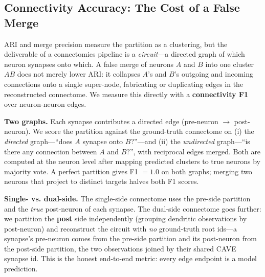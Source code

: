\documentclass[10pt,letterpaper]{article}
\begin{document}
\subsection{Connectivity Accuracy: The Cost of a False Merge}
\label{sec:connectivity}

ARI and merge precision measure the partition as a clustering, but the deliverable of a
connectomics pipeline is a \emph{circuit}---a directed graph of which neuron synapses onto
which. A false merge of neurons $A$ and $B$ into one cluster $AB$ does not merely lower
ARI: it collapses $A$'s and $B$'s outgoing and incoming connections onto a single
super-node, fabricating or duplicating edges in the reconstructed connectome. We measure
this directly with a \textbf{connectivity F1} over neuron-neuron edges.

\textbf{Two graphs.} Each synapse contributes a directed edge (pre-neuron $\to$
post-neuron). We score the partition against the ground-truth connectome on (i) the
\emph{directed} graph---``does $A$ synapse onto $B$?''---and (ii) the \emph{undirected}
graph---``is there any connection between $A$ and $B$?'', with reciprocal edges merged.
Both are computed at the neuron level after mapping predicted clusters to true neurons by
majority vote. A perfect partition gives F1 $= 1.0$ on both graphs; merging two neurons
that project to distinct targets halves both F1 scores.

\textbf{Single- vs. dual-side.} The single-side connectome uses the pre-side partition and
the \emph{true} post-neuron of each synapse. The dual-side connectome goes further: we
partition the \textbf{post} side independently (grouping dendritic observations by
post-neuron) and reconstruct the circuit with \emph{no} ground-truth root ids---a synapse's
pre-neuron comes from the pre-side partition and its post-neuron from the post-side
partition, the two observations joined by their shared CAVE synapse id. This is the honest
end-to-end metric: every edge endpoint is a model prediction.
\end{document}
